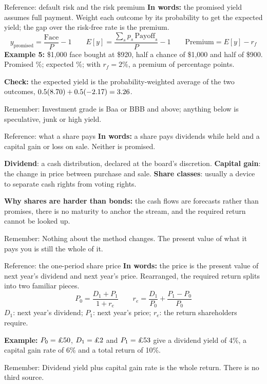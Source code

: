 \documentclass[10pt,aspectratio=169]{beamer}
\newcommand{\remember}[1]{\par\smallskip\alert{Remember:} #1}
\renewcommand{\pounds}{\ifmmode\text{\textsterling}\else\textsterling\fi}
\begin{document}
\begin{frame}[label=credit]{Reference: default risk and the risk premium}
\textbf{In words:} the promised yield assumes full payment. Weight each outcome by its probability to get the expected yield; the gap over the risk-free rate is the premium.
\[
y_{\text{promised}}=\frac{\text{Face}}{P}-1
\qquad
E[y]=\frac{\sum_s p_s\,\text{Payoff}_s}{P}-1
\qquad
\text{Premium}=E[y]-r_f
\]
\textbf{Example 5:} \$1,000 face bought at \$920, half a chance of \$1,000 and half of \$900. Promised \LExFivePromised\%; expected \LExFiveExpected\%; with $r_f=2\%$, a premium of \LExFivePremium{} percentage points.
\par\smallskip
\textbf{Check:} the expected yield is the probability-weighted average of the two outcomes, $0.5(8.70)+0.5(-2.17)=3.26$.
\remember{Investment grade is Baa or BBB and above; anything below is speculative, junk or high yield.}
\end{frame}

\begin{frame}[label=stockbasics]{Reference: what a share pays}
\textbf{In words:} a share pays dividends while held and a capital gain or loss on sale. Neither is promised.
\par\smallskip
\textbf{Dividend}: a cash distribution, declared at the board's discretion. \textbf{Capital gain}: the change in price between purchase and sale. \textbf{Share classes}: usually a device to separate cash rights from voting rights.
\par\smallskip
\textbf{Why shares are harder than bonds:} the cash flows are forecasts rather than promises, there is no maturity to anchor the stream, and the required return cannot be looked up.
\remember{Nothing about the method changes. The present value of what it pays you is still the whole of it.}
\end{frame}

\begin{frame}[label=oneperiod]{Reference: the one-period share price}
\textbf{In words:} the price is the present value of next year's dividend and next year's price. Rearranged, the required return splits into two familiar pieces.
\[
P_0=\frac{D_1+P_1}{1+r_e}
\qquad
r_e=\frac{D_1}{P_0}+\frac{P_1-P_0}{P_0}
\]
$D_1$: next year's dividend; $P_1$: next year's price; $r_e$: the return shareholders require.
\par\smallskip
\textbf{Example:} $P_0=\pounds50$, $D_1=\pounds2$ and $P_1=\pounds53$ give a dividend yield of 4\%, a capital gain rate of 6\% and a total return of 10\%.
\remember{Dividend yield plus capital gain rate is the whole return. There is no third source.}
\end{frame}
\end{document}
